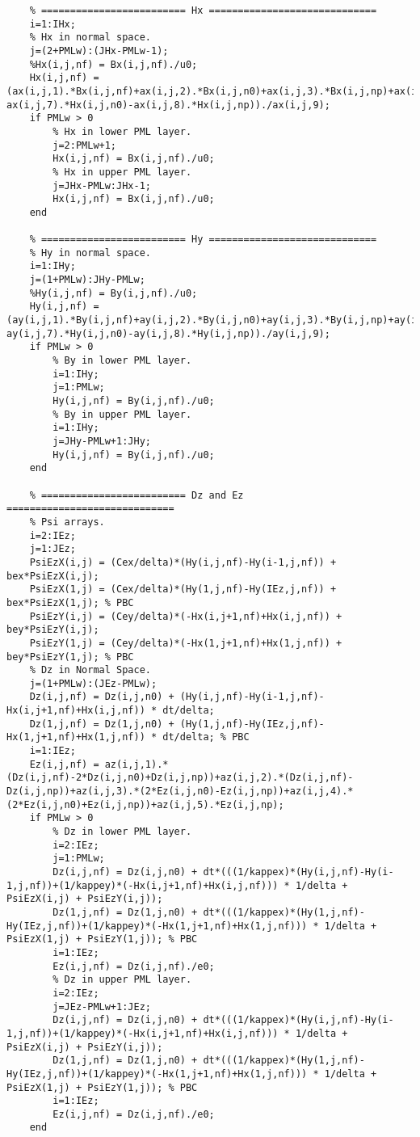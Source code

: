 \begin{lstlisting}
    % ========================= Hx =============================
    i=1:IHx;
    % Hx in normal space.
    j=(2+PMLw):(JHx-PMLw-1);
    %Hx(i,j,nf) = Bx(i,j,nf)./u0;
    Hx(i,j,nf) = (ax(i,j,1).*Bx(i,j,nf)+ax(i,j,2).*Bx(i,j,n0)+ax(i,j,3).*Bx(i,j,np)+ax(i,j,4).*ByAve(i,j,nf)+ax(i,j,5).*ByAve(i,j,n0)+ax(i,j,6).*ByAve(i,j,np)-ax(i,j,7).*Hx(i,j,n0)-ax(i,j,8).*Hx(i,j,np))./ax(i,j,9);
    if PMLw > 0
        % Hx in lower PML layer.
        j=2:PMLw+1;
        Hx(i,j,nf) = Bx(i,j,nf)./u0;
        % Hx in upper PML layer.
        j=JHx-PMLw:JHx-1;
        Hx(i,j,nf) = Bx(i,j,nf)./u0;
    end
    
    % ========================= Hy =============================
    % Hy in normal space.
    i=1:IHy;
    j=(1+PMLw):JHy-PMLw;
    %Hy(i,j,nf) = By(i,j,nf)./u0;
    Hy(i,j,nf) = (ay(i,j,1).*By(i,j,nf)+ay(i,j,2).*By(i,j,n0)+ay(i,j,3).*By(i,j,np)+ay(i,j,4).*BxAve(i,j,nf)+ay(i,j,5).*BxAve(i,j,n0)+ay(i,j,6).*BxAve(i,j,np)-ay(i,j,7).*Hy(i,j,n0)-ay(i,j,8).*Hy(i,j,np))./ay(i,j,9);
    if PMLw > 0
        % By in lower PML layer.
        i=1:IHy;
        j=1:PMLw;
        Hy(i,j,nf) = By(i,j,nf)./u0;
        % By in upper PML layer.
        i=1:IHy;
        j=JHy-PMLw+1:JHy;
        Hy(i,j,nf) = By(i,j,nf)./u0;
    end
    
    % ========================= Dz and Ez =============================
    % Psi arrays.
    i=2:IEz;
    j=1:JEz;
    PsiEzX(i,j) = (Cex/delta)*(Hy(i,j,nf)-Hy(i-1,j,nf)) + bex*PsiEzX(i,j);
    PsiEzX(1,j) = (Cex/delta)*(Hy(1,j,nf)-Hy(IEz,j,nf)) + bex*PsiEzX(1,j); % PBC
    PsiEzY(i,j) = (Cey/delta)*(-Hx(i,j+1,nf)+Hx(i,j,nf)) + bey*PsiEzY(i,j);
    PsiEzY(1,j) = (Cey/delta)*(-Hx(1,j+1,nf)+Hx(1,j,nf)) + bey*PsiEzY(1,j); % PBC
    % Dz in Normal Space.
    j=(1+PMLw):(JEz-PMLw);
    Dz(i,j,nf) = Dz(i,j,n0) + (Hy(i,j,nf)-Hy(i-1,j,nf)-Hx(i,j+1,nf)+Hx(i,j,nf)) * dt/delta;
    Dz(1,j,nf) = Dz(1,j,n0) + (Hy(1,j,nf)-Hy(IEz,j,nf)-Hx(1,j+1,nf)+Hx(1,j,nf)) * dt/delta; % PBC
    i=1:IEz;
    Ez(i,j,nf) = az(i,j,1).*(Dz(i,j,nf)-2*Dz(i,j,n0)+Dz(i,j,np))+az(i,j,2).*(Dz(i,j,nf)-Dz(i,j,np))+az(i,j,3).*(2*Ez(i,j,n0)-Ez(i,j,np))+az(i,j,4).*(2*Ez(i,j,n0)+Ez(i,j,np))+az(i,j,5).*Ez(i,j,np);
    if PMLw > 0
        % Dz in lower PML layer.
        i=2:IEz;
        j=1:PMLw;
        Dz(i,j,nf) = Dz(i,j,n0) + dt*(((1/kappex)*(Hy(i,j,nf)-Hy(i-1,j,nf))+(1/kappey)*(-Hx(i,j+1,nf)+Hx(i,j,nf))) * 1/delta + PsiEzX(i,j) + PsiEzY(i,j));
        Dz(1,j,nf) = Dz(1,j,n0) + dt*(((1/kappex)*(Hy(1,j,nf)-Hy(IEz,j,nf))+(1/kappey)*(-Hx(1,j+1,nf)+Hx(1,j,nf))) * 1/delta + PsiEzX(1,j) + PsiEzY(1,j)); % PBC
        i=1:IEz;
        Ez(i,j,nf) = Dz(i,j,nf)./e0;
        % Dz in upper PML layer.
        i=2:IEz;
        j=JEz-PMLw+1:JEz;
        Dz(i,j,nf) = Dz(i,j,n0) + dt*(((1/kappex)*(Hy(i,j,nf)-Hy(i-1,j,nf))+(1/kappey)*(-Hx(i,j+1,nf)+Hx(i,j,nf))) * 1/delta + PsiEzX(i,j) + PsiEzY(i,j));
        Dz(1,j,nf) = Dz(1,j,n0) + dt*(((1/kappex)*(Hy(1,j,nf)-Hy(IEz,j,nf))+(1/kappey)*(-Hx(1,j+1,nf)+Hx(1,j,nf))) * 1/delta + PsiEzX(1,j) + PsiEzY(1,j)); % PBC
        i=1:IEz;
        Ez(i,j,nf) = Dz(i,j,nf)./e0;
    end
            

\end{lstlisting}
